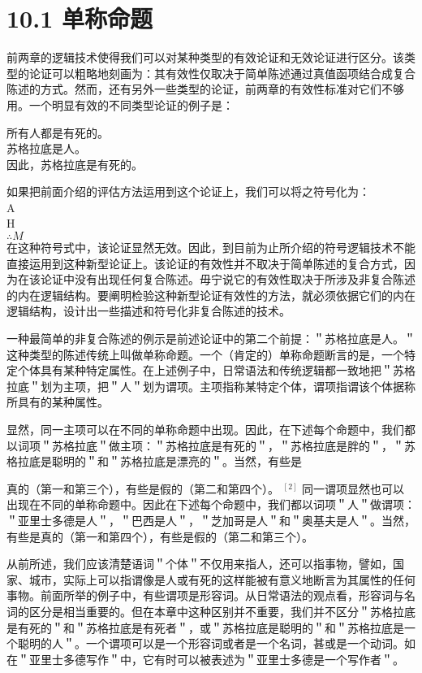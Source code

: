 \section*{10.1 单称命题}
前两章的逻辑技术使得我们可以对某种类型的有效论证和无效论证进行区分。该类型的论证可以粗略地刻画为：其有效性仅取决于简单陈述通过真值函项结合成复合陈述的方式。然而，还有另外一些类型的论证，前两章的有效性标准对它们不够用。一个明显有效的不同类型论证的例子是：

所有人都是有死的。\\
苏格拉底是人。\\
因此，苏格拉底是有死的。

如果把前面介绍的评估方法运用到这个论证上，我们可以将之符号化为：\\
A\\
H\\
$\therefore M$\\
在这种符号式中，该论证显然无效。因此，到目前为止所介绍的符号逻辑技术不能直接运用到这种新型论证上。该论证的有效性并不取决于简单陈述的复合方式，因为在该论证中没有出现任何复合陈述。毋宁说它的有效性取决于所涉及非复合陈述的内在逻辑结构。要阐明检验这种新型论证有效性的方法，就必须依据它们的内在逻辑结构，设计出一些描述和符号化非复合陈述的技术。

一种最简单的非复合陈述的例示是前述论证中的第二个前提：＂苏格拉底是人。＂这种类型的陈述传统上叫做单称命题。一个（肯定的）单称命题断言的是，一个特定个体具有某种特定属性。在上述例子中，日常语法和传统逻辑都一致地把＂苏格拉底＂划为主项，把＂人＂划为谓项。主项指称某特定个体，谓项指谓该个体据称所具有的某种属性。

显然，同一主项可以在不同的单称命题中出现。因此，在下述每个命题中，我们都以词项＂苏格拉底＂做主项：＂苏格拉底是有死的＂，＂苏格拉底是胖的＂，＂苏格拉底是聪明的＂和＂苏格拉底是漂亮的＂。当然，有些是

真的（第一和第三个），有些是假的（第二和第四个）。 ${ }^{[2]}$ 同一谓项显然也可以出现在不同的单称命题中。因此在下述每个命题中，我们都以词项＂人＂做谓项：＂亚里士多德是人＂，＂巴西是人＂，＂芝加哥是人＂和＂奥基夫是人＂。当然，有些是真的（第一和第四个），有些是假的（第二和第三个）。

从前所述，我们应该清楚语词＂个体＂不仅用来指人，还可以指事物，譬如，国家、城市，实际上可以指谓像是人或有死的这样能被有意义地断言为其属性的任何事物。前面所举的例子中，有些谓项是形容词。从日常语法的观点看，形容词与名词的区分是相当重要的。但在本章中这种区别并不重要，我们并不区分＂苏格拉底是有死的＂和＂苏格拉底是有死者＂，或＂苏格拉底是聪明的＂和＂苏格拉底是一个聪明的人＂。一个谓项可以是一个形容词或者是一个名词，甚或是一个动词。如在＂亚里士多德写作＂中，它有时可以被表述为＂亚里士多德是一个写作者＂。

